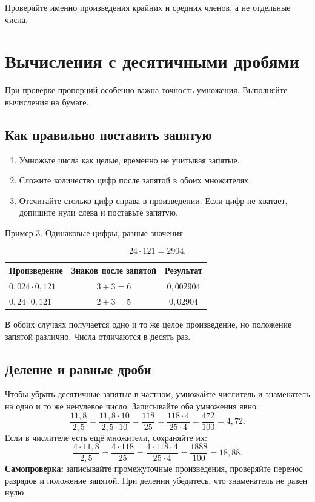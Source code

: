 \documentclass[a4paper,12pt]{article}
\newcommand{\ex}[1]{\par\medskip\textcolor{darkaccent}{#1}\par\smallskip}
\begin{document}
\textcolor{darkaccent}{Проверяйте именно произведения крайних и средних членов, а не отдельные числа.}

\clearpage
\section{Вычисления с десятичными дробями}
При проверке пропорций особенно важна точность умножения. Выполняйте вычисления на бумаге.
\subsection{Как правильно поставить запятую}
\begin{enumerate}
\item Умножьте числа как целые, временно не учитывая запятые.
\item Сложите количество цифр после запятой в обоих множителях.
\item Отсчитайте столько цифр справа в произведении. Если цифр не хватает, допишите нули слева и поставьте запятую.
\end{enumerate}
\ex{Пример 3. Одинаковые цифры, разные значения}
\[
24\cdot121=2904.
\]
\begin{center}
\renewcommand{\arraystretch}{1.35}
\begin{tabular}{lcc}
\toprule
Произведение & Знаков после запятой & Результат\\
\midrule
$0,024\cdot0,121$ & $3+3=6$ & $0,002904$\\
$0,24\cdot0,121$ & $2+3=5$ & $0,02904$\\
\bottomrule
\end{tabular}
\end{center}
В обоих случаях получается одно и то же целое произведение, но положение запятой различно. Числа отличаются в десять раз.
\subsection{Деление и равные дроби}
Чтобы убрать десятичные запятые в частном, умножайте числитель и знаменатель на одно и то же ненулевое число. Записывайте оба умножения явно:
\[
\frac{11,8}{2,5}=\frac{11,8\cdot10}{2,5\cdot10}=\frac{118}{25}
=\frac{118\cdot4}{25\cdot4}=\frac{472}{100}=4,72.
\]
Если в числителе есть ещё множители, сохраняйте их:
\[
\frac{4\cdot11,8}{2,5}=\frac{4\cdot118}{25}
=\frac{4\cdot118\cdot4}{25\cdot4}=\frac{1888}{100}=18,88.
\]
\textbf{Самопроверка:} записывайте промежуточные произведения, проверяйте перенос разрядов и положение запятой. При делении убедитесь, что знаменатель не равен нулю.
\end{document}
